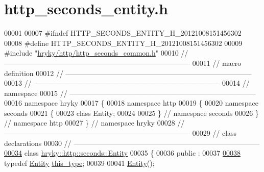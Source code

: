 \hypertarget{http__seconds__entity_8h_source}{\section{http\-\_\-seconds\-\_\-entity.\-h}
}

\begin{DoxyCode}
00001 
00007 \textcolor{preprocessor}{#ifndef HTTP\_SECONDS\_ENTITY\_H\_20121008151456302}
00008 \textcolor{preprocessor}{}\textcolor{preprocessor}{#define HTTP\_SECONDS\_ENTITY\_H\_20121008151456302}
00009 \textcolor{preprocessor}{}\textcolor{preprocessor}{#include "\hyperlink{http__seconds__common_8h}{hryky/http/http_seconds_common.h}"}
00010 \textcolor{comment}{//
      ------------------------------------------------------------------------------}
00011 \textcolor{comment}{// macro definition}
00012 \textcolor{comment}{//
      ------------------------------------------------------------------------------}
00013 \textcolor{comment}{//
      ------------------------------------------------------------------------------}
00014 \textcolor{comment}{// namespace}
00015 \textcolor{comment}{//
      ------------------------------------------------------------------------------}
00016 \textcolor{keyword}{namespace }hryky
00017 \{
00018 \textcolor{keyword}{namespace }http
00019 \{
00020 \textcolor{keyword}{namespace }seconds
00021 \{
00023     \textcolor{keyword}{class }Entity;
00024 
00025 \} \textcolor{comment}{// namespace seconds}
00026 \} \textcolor{comment}{// namespace http}
00027 \} \textcolor{comment}{// namespace hryky}
00028 \textcolor{comment}{//
      ------------------------------------------------------------------------------}
00029 \textcolor{comment}{// class declarations}
00030 \textcolor{comment}{//
      ------------------------------------------------------------------------------}
\hypertarget{http__seconds__entity_8h_source_l00034}{}\hyperlink{classhryky_1_1http_1_1seconds_1_1_entity}{00034} \textcolor{comment}{}\textcolor{keyword}{class }\hyperlink{classhryky_1_1http_1_1seconds_1_1_entity}{hryky::http::seconds::Entity}
00035 \{
00036 \textcolor{keyword}{public} :
00037 
\hypertarget{http__seconds__entity_8h_source_l00038}{}\hyperlink{classhryky_1_1http_1_1seconds_1_1_entity_a1a69109f5c7e9998e36e4a6eae23d74d}{00038}     \textcolor{keyword}{typedef} \hyperlink{classhryky_1_1http_1_1seconds_1_1_entity}{Entity} \hyperlink{classhryky_1_1http_1_1seconds_1_1_entity_a1a69109f5c7e9998e36e4a6eae23d74d}{this_type};
00039 
00041     \hyperlink{classhryky_1_1http_1_1seconds_1_1_entity_a932fb5a36c730e4192ee5e87708d46ee}{Entity}();

\end{DoxyCode}
